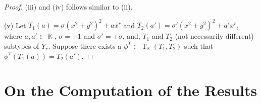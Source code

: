 \documentclass[noend]{amsproc}
\theoremstyle{definition}
\DeclareMathOperator{\R}{\mathbb{R}}
\DeclareMathOperator{\C}{\mathbb{C}}
\DeclareMathOperator{\K}{\mathbb{K}}
\DeclareMathOperator{\T}{T}
\begin{document}
\begin{proof}
(iii) and (iv)  follows similar to (ii).

(v) Let $T_1(a)=\sigma(x^2+y^2)^2+ax^r$ and $T_2(a')=\sigma'(x^2+y^2)^2+a'x^r$, where $a,a'\in\K$, $\sigma=\pm 1$ and $\sigma'=\pm\sigma$, and, $T_1$ and $T_2$ (not necessarily different) subtypes of $\widetilde Y_{r}$. Suppose there exists a $\phi^T\in\T_{\K}(T_1,T_2)$ such that $\phi^T(T_1(a))=T_2(a')$.
%
%
\end{proof}


\section{On the Computation of the Results}\label{OnTheComputationOfTheResults}
\end{document}
